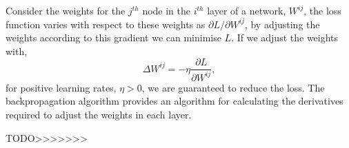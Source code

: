 Consider the weights for the $j^{th}$ node in the $i^{th}$ layer of a network,
$W^{ij}$, the loss function varies with respect to these weights as $\partial 
L/\partial W^{ ij }$, by adjusting the weights according to this gradient we 
can minimise $L$. If we adjust the weights with,
\begin{equation}
	\Delta W^{ ij } = -\eta \frac{\partial L}{\partial W^{ ij }},
\end{equation}
for positive learning rates, $\eta > 0$, we are guaranteed to reduce the loss. 
The backpropagation algorithm provides an algorithm for calculating the 
derivatives required to adjust the weights in each layer.

TODO>>>>>>>




